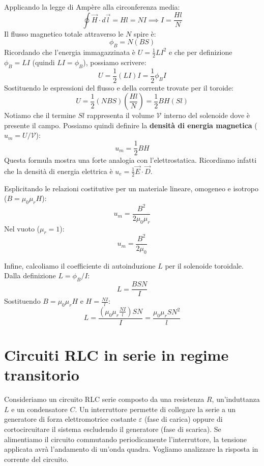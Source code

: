 \documentclass{book}
\begin{document}
Applicando la legge di Ampère alla circonferenza media:
$$
\oint \vec{H} \cdot d\vec{l} = H l = N I \implies I = \frac{H l}{N}
$$
Il flusso magnetico totale attraverso le $N$ spire è:
$$
\phi_B = N (B S)
$$
Ricordando che l'energia immagazzinata è $U = \frac{1}{2} L I^2$ e che per definizione $\phi_B = L I$ (quindi $LI = \phi_B$), possiamo scrivere:
$$
U = \frac{1}{2} (L I) I = \frac{1}{2} \phi_B I
$$
Sostituendo le espressioni del flusso e della corrente trovate per il toroide:
$$
U = \frac{1}{2} (N B S) \left( \frac{H l}{N} \right) = \frac{1}{2} B H (S l)
$$
Notiamo che il termine $S l$ rappresenta il volume $\mathcal{V}$ interno del solenoide dove è presente il campo.
Possiamo quindi definire la \textbf{densità di energia magnetica} ($u_m = U/\mathcal{V}$):
$$
u_m = \frac{1}{2} B H
$$
Questa formula mostra una forte analogia con l'elettrostatica. Ricordiamo infatti che la densità di energia elettrica è $u_e = \frac{1}{2} \vec{E} \cdot \vec{D}$.

Esplicitando le relazioni costitutive per un materiale lineare, omogeneo e isotropo ($B = \mu_0 \mu_r H$):
$$
u_m = \frac{B^2}{2 \mu_0 \mu_r}
$$
Nel vuoto ($\mu_r=1$):
$$
u_m = \frac{B^2}{2 \mu_0}
$$

Infine, calcoliamo il coefficiente di autoinduzione $L$ per il solenoide toroidale. Dalla definizione $L = \phi_B / I$:
$$
L = \frac{B S N}{I}
$$
Sostituendo $B = \mu_0 \mu_r H$ e $H = \frac{N I}{l}$:
$$
L = \frac{(\mu_0 \mu_r \frac{N I}{l}) S N}{I} = \frac{\mu_0 \mu_r S N^2}{l}
$$


\section{Circuiti RLC in serie in regime transitorio}
Consideriamo un circuito RLC serie composto da una resistenza $R$, un'induttanza $L$ e un condensatore $C$. Un interruttore permette di collegare la serie a un generatore di forza elettromotrice costante $\varepsilon$ (fase di carica) oppure di cortocircuitare il sistema escludendo il generatore (fase di scarica).
Se alimentiamo il circuito commutando periodicamente l'interruttore, la tensione applicata avrà l'andamento di un'onda quadra. Vogliamo analizzare la risposta in corrente del circuito.
\end{document}
